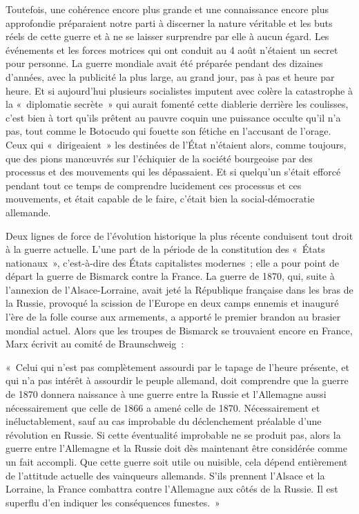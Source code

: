 \documentclass[french,twoside]{book} %
\newenvironment{quoteblock}%
  {\begin{quoting}}
  {\end{quoting}}
\newenvironment{quotebar}{%
    \def\FrameCommand{{\color{rubric!10!}\vrule width 0.5em} \hspace{0.9em}}%
    \def\OuterFrameSep{\itemsep} %
    \MakeFramed {\advance\hsize-\width \FrameRestore}
  }%
  {%
    \endMakeFramed
  }
\renewenvironment{quoteblock}%
  {%
    \savenotes
    \setstretch{0.9}
    \normalfont
    \begin{quotebar}
  }
  {%
    \end{quotebar}
    \spewnotes
  }
\begin{document}
\noindent Toutefois, une cohérence encore plus grande et une connaissance encore plus approfondie préparaient notre parti à discerner la nature véritable et les buts réels de cette guerre et à ne se laisser surprendre par elle à aucun égard. Les événements et les forces motrices qui ont conduit au 4 août n’étaient un secret pour personne. La guerre mondiale avait été préparée pendant des dizaines d’années, avec la publicité la plus large, au grand jour, pas à pas et heure par heure. Et si aujourd’hui plusieurs socialistes imputent avec colère la catastrophe à la « diplomatie secrète » qui aurait fomenté cette diablerie derrière les coulisses, c’est bien à tort qu’ils prêtent au pauvre coquin une puissance occulte qu’il n’a pas, tout comme le Botocudo qui fouette son fétiche en l’accusant de l’orage. Ceux qui « dirigeaient » les destinées de l’État n’étaient alors, comme toujours, que des pions manœuvrés sur l’échiquier de la société bourgeoise par des processus et des mouvements qui les dépassaient. Et si quelqu’un s’était efforcé pendant tout ce temps de comprendre lucidement ces processus et ces mouvements, et était capable de le faire, c’était bien la social-démocratie allemande.\par
Deux lignes de force de l’évolution historique la plus récente conduisent tout droit à la guerre actuelle. L'une part de la période de la constitution des « États nationaux », c’est-à-dire des États capitalistes modernes ; elle a pour point de départ la guerre de Bismarck contre la France. La guerre de 1870, qui, suite à l’annexion de l’Alsace-Lorraine, avait jeté la République française dans les bras de la Russie, provoqué la scission de l’Europe en deux camps ennemis et inauguré l’ère de la folle course aux armements, a apporté le premier brandon au brasier mondial actuel. Alors que les troupes de Bismarck se trouvaient encore en France, Marx écrivit au comité de Braunschweig :\par

\begin{quoteblock}
 \noindent   « Celui qui n’est pas complètement assourdi par le tapage de l’heure présente, et qui n’a pas intérêt à assourdir le peuple allemand, doit comprendre que la guerre de 1870 donnera naissance à une guerre entre la Russie et l’Allemagne aussi nécessairement que celle de 1866 a amené celle de 1870. Nécessairement et inéluctablement, sauf au cas improbable du déclenchement préalable d’une révolution en Russie. Si cette éventualité improbable ne se produit pas, alors la guerre entre l’Allemagne et la Russie doit dès maintenant être considérée comme un fait accompli. Que cette guerre soit utile ou nuisible, cela dépend entièrement de l’attitude actuelle des vainqueurs allemands. S'ils prennent l’Alsace et la Lorraine, la France combattra contre l’Allemagne aux côtés de la Russie. Il est superflu d’en indiquer les conséquences funestes. »
\end{quoteblock}
\end{document}
